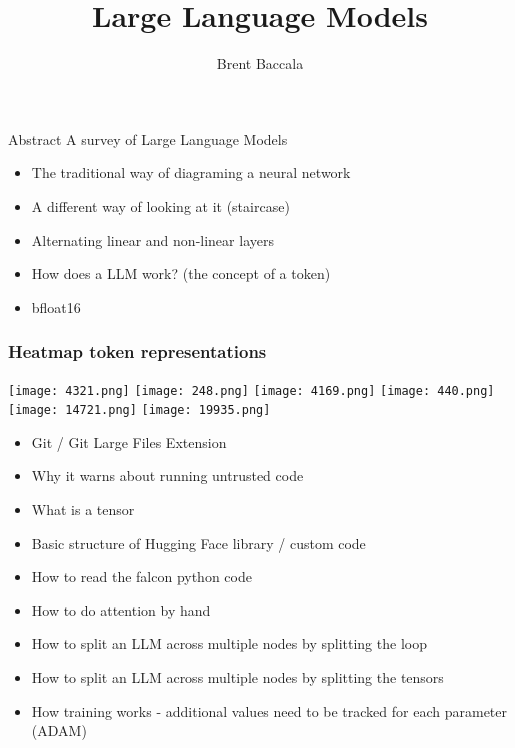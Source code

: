 \documentclass{beamer}
\title{Large Language Models}
\author{Brent Baccala}
\institute{\tt cosine@freesoft.org}
\begin{document}
\begin{frame}
\titlepage
\begin{block}{Abstract}
A survey of Large Language Models
\end{block}
\end{frame}

\begin{frame}
\begin{itemize}
\item The traditional way of diagraming a neural network
\item A different way of looking at it (staircase)
\item Alternating linear and non-linear layers
\item How does a LLM work? (the concept of a token)
\item bfloat16
\end{itemize}
\end{frame}

\begin{frame}
\frametitle{Heatmap token representations}
\texttt{[image: 4321.png]}
\texttt{[image: 248.png]}
\texttt{[image: 4169.png]}
\texttt{[image: 440.png]}
\texttt{[image: 14721.png]}
\texttt{[image: 19935.png]}
\end{frame}

\begin{frame}
\begin{itemize}
\item Git / Git Large Files Extension
\item Why it warns about running untrusted code
\item What is a tensor
\item Basic structure of Hugging Face library / custom code
\item How to read the falcon python code
\item How to do attention by hand
\item How to split an LLM across multiple nodes by splitting the loop
\item How to split an LLM across multiple nodes by splitting the tensors
\item How training works - additional values need to be tracked for each parameter (ADAM)
\end{itemize}
\end{frame}
\end{document}
